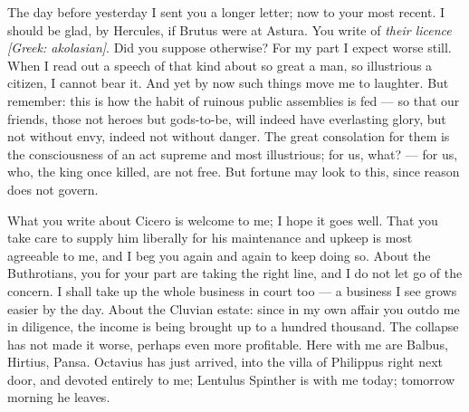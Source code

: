 

 The day before yesterday I sent you a longer letter; now to your most recent. I should be glad, by Hercules, if Brutus were at Astura. You write of \textit{their licence} \textit{[Greek: akolasian]}. Did you suppose otherwise? For my part I expect worse still. When I read out a speech of that kind about so great a man, so illustrious a citizen, I cannot bear it. And yet by now such things move me to laughter. But remember: this is how the habit of ruinous public assemblies is fed --- so that our friends, those not heroes but gods-to-be, will indeed have everlasting glory, but not without envy, indeed not without danger. The great consolation for them is the consciousness of an act supreme and most illustrious; for us, what? --- for us, who, the king once killed, are not free. But fortune may look to this, since reason does not govern.

 What you write about Cicero is welcome to me; I hope it goes well. That you take care to supply him liberally for his maintenance and upkeep is most agreeable to me, and I beg you again and again to keep doing so. About the Buthrotians, you for your part are taking the right line, and I do not let go of the concern. I shall take up the whole business in court too --- a business I see grows easier by the day. About the Cluvian estate: since in my own affair you outdo me in diligence, the income is being brought up to a hundred thousand. The collapse has not made it worse, perhaps even more profitable. Here with me are Balbus, Hirtius, Pansa. Octavius has just arrived, into the villa of Philippus right next door, and devoted entirely to me; Lentulus Spinther is with me today; tomorrow morning he leaves.
